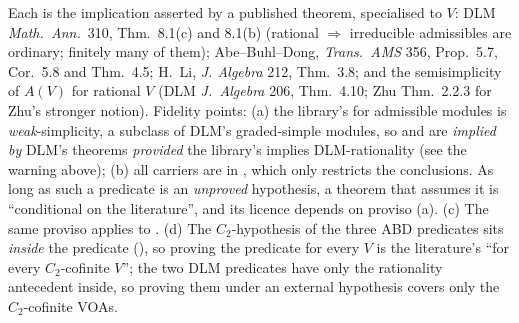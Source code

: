 \begin{dictionary}
Each  is the implication asserted by a published theorem, specialised to $V$: DLM \emph{Math.\ Ann.}~310,
Thm.~8.1(c) and 8.1(b) (rational $\Rightarrow$ irreducible admissibles are ordinary; finitely many of them);
Abe--Buhl--Dong, \emph{Trans.\ AMS} 356, Prop.~5.7, Cor.~5.8 and Thm.~4.5; H.~Li, \emph{J. Algebra} 212, Thm.~3.8; and
the semisimplicity of $A(V)$ for rational $V$ (DLM \emph{J.~Algebra} 206, Thm.~4.10; Zhu Thm.~2.2.3 for Zhu's stronger
notion). Fidelity points: (a) the library's  for admissible modules is \emph{weak}-simplicity, a subclass of
DLM's graded-simple modules, so  and  are
\emph{implied by} DLM's theorems \emph{provided} the library's  implies DLM-rationality (see the
warning above); (b) all carriers are in , which only restricts the conclusions. As long as such a predicate is
an \emph{unproved} hypothesis, a theorem that assumes it is ``conditional on the literature'', and its licence depends on
proviso (a). (c) The same proviso applies to . (d) The $C_2$-hypothesis of the three ABD
predicates sits \emph{inside} the predicate (), so proving the predicate for every $V$ is the
literature's ``for every $C_2$-cofinite $V$''; the two DLM predicates have only the rationality antecedent inside, so
proving them under an external hypothesis  covers only the $C_2$-cofinite VOAs.


\end{dictionary}
